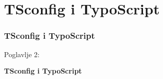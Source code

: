 %

\section{TSconfig i TypoScript}
\begin{frame}[fragile]
	\frametitle{TSconfig i TypoScript}

	\begin{center}\huge{Poglavlje 2:}\end{center}
	\begin{center}\huge{\color{typo3darkgrey}\textbf{TSconfig i TypoScript}}\end{center}

\end{frame}

